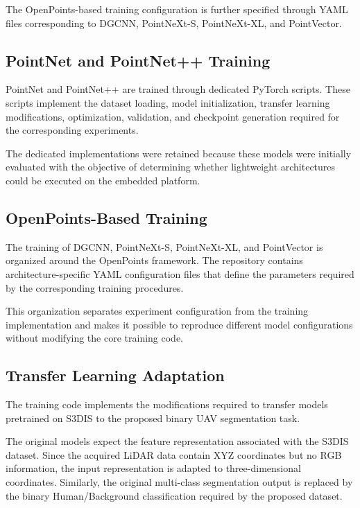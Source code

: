 The OpenPoints-based training configuration is further specified through YAML files corresponding to DGCNN, PointNeXt-S, PointNeXt-XL, and PointVector.

\subsection{PointNet and PointNet++ Training}

PointNet and PointNet++ are trained through dedicated PyTorch scripts. These scripts implement the dataset loading, model initialization, transfer learning modifications, optimization, validation, and checkpoint generation required for the corresponding experiments.

The dedicated implementations were retained because these models were initially evaluated with the objective of determining whether lightweight architectures could be executed on the embedded platform.

\subsection{OpenPoints-Based Training}

The training of DGCNN, PointNeXt-S, PointNeXt-XL, and PointVector is organized around the OpenPoints framework. The repository contains architecture-specific YAML configuration files that define the parameters required by the corresponding training procedures.

This organization separates experiment configuration from the training implementation and makes it possible to reproduce different model configurations without modifying the core training code.

\subsection{Transfer Learning Adaptation}

The training code implements the modifications required to transfer models pretrained on S3DIS to the proposed binary UAV segmentation task.

The original models expect the feature representation associated with the S3DIS dataset. Since the acquired LiDAR data contain XYZ coordinates but no RGB information, the input representation is adapted to three-dimensional coordinates. Similarly, the original multi-class segmentation output is replaced by the binary Human/Background classification required by the proposed dataset.

